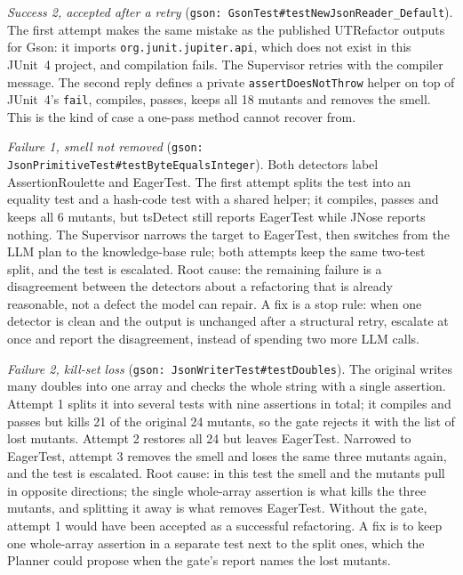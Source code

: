 \emph{Success 2, accepted after a retry} (\texttt{gson: GsonTest\#\allowbreak testNewJsonReader\_Default}). The first attempt makes the same mistake as the published UTRefactor outputs for Gson: it imports \texttt{org.junit.jupiter.api}, which does not exist in this JUnit~4 project, and compilation fails. The Supervisor retries with the compiler message. The second reply defines a private \texttt{assertDoesNotThrow} helper on top of JUnit~4's \texttt{fail}, compiles, passes, keeps all 18 mutants and removes the smell. This is the kind of case a one-pass method cannot recover from.

\emph{Failure 1, smell not removed} (\texttt{gson: JsonPrimitiveTest\#\allowbreak testByteEqualsInteger}). Both detectors label AssertionRoulette and EagerTest. The first attempt splits the test into an equality test and a hash-code test with a shared helper; it compiles, passes and keeps all 6 mutants, but tsDetect still reports EagerTest while JNose reports nothing. The Supervisor narrows the target to EagerTest, then switches from the LLM plan to the knowledge-base rule; both attempts keep the same two-test split, and the test is escalated.
Root cause: the remaining failure is a disagreement between the detectors about a refactoring that is already reasonable, not a defect the model can repair. A fix is a stop rule: when one detector is clean and the output is unchanged after a structural retry, escalate at once and report the disagreement, instead of spending two more LLM calls.

\emph{Failure 2, kill-set loss} (\texttt{gson: JsonWriterTest\#\allowbreak testDoubles}). The original writes many doubles into one array and checks the whole string with a single assertion. Attempt 1 splits it into several tests with nine assertions in total; it compiles and passes but kills 21 of the original 24 mutants, so the gate rejects it with the list of lost mutants. Attempt 2 restores all 24 but leaves EagerTest. Narrowed to EagerTest, attempt 3 removes the smell and loses the same three mutants again, and the test is escalated.
Root cause: in this test the smell and the mutants pull in opposite directions; the single whole-array assertion is what kills the three mutants, and splitting it away is what removes EagerTest. Without the gate, attempt 1 would have been accepted as a successful refactoring. A fix is to keep one whole-array assertion in a separate test next to the split ones, which the Planner could propose when the gate's report names the lost mutants.
